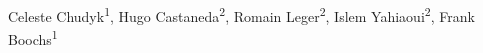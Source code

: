 
Celeste Chudyk\textsuperscript{1}, Hugo Castaneda\textsuperscript{2}, Romain Leger\textsuperscript{2}, Islem Yahiaoui\textsuperscript{2}, Frank Boochs\textsuperscript{1}

